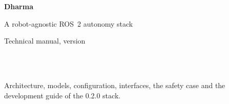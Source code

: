 \documentclass[11pt,a4paper,oneside]{report}
\begin{document}
\begin{titlepage}
  \centering
  \vspace*{3cm}
  {\sffamily\bfseries\Huge Dharma\par}
  \vspace{0.6cm}
  {\sffamily\Large A robot-agnostic ROS~2 autonomy stack\par}
  \vspace{0.3cm}
  {\sffamily\large Technical manual, version \DharmaVersion\par}
  \vspace{2.5cm}
  {\large \DharmaAuthor\par}
  \vspace{0.3cm}
  {\small \DharmaAffilOne\\ \DharmaAffilTwo\\ \DharmaEmail\par}
  \vfill
  {\small Architecture, models, configuration, interfaces, the safety case and the development
  guide of the 0.2.0 stack.\par}
\end{titlepage}

\tableofcontents
















\appendix




\end{document}
